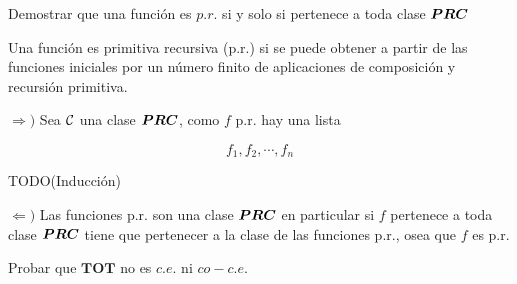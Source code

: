 \documentclass[leqno, 12pt, twoside,letterpaper]{book}
\begin{document}
\begin{ej}{5}
    Demostrar que una función es $p.r.$ si y solo si pertenece a toda clase
    $\bm{PRC}$
\end{ej}

\begin{solucion}

\begin{defi} Una función es primitiva recursiva (p.r.) si se puede obtener a partir de las funciones iniciales por un número finito de aplicaciones de composición y recursión primitiva.
\end{defi}

\begin{dem}
$\Rightarrow)$ Sea $\mathcal{C}$ una clase $\bm{PRC}$, como $f$ p.r. hay una lista

	\[ f_1, f_2, \cdots, f_n \]

	TODO(Inducción)

\noindent $\Leftarrow)$ Las funciones p.r. son una clase $\bm{PRC}$ en particular si $f$ pertenece a toda clase $\bm{PRC}$ tiene que pertenecer a la clase de las funciones p.r., osea que $f$ es p.r.
\end{dem}
\end{solucion}
\begin{ej}{4}
    Probar que $\bm{TOT}$ no es $c.e.$ ni $co-c.e.$
\end{ej}
\end{document}
